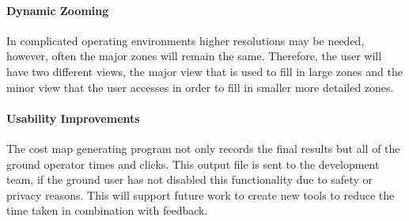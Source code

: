 \paragraph{Dynamic Zooming}
In complicated operating environments higher resolutions may be needed, however, often the major zones will remain the same. Therefore, the user will have two different views, the major view that is used to fill in large zones and the minor view that the user accesses in order to fill in smaller more detailed zones. 
\paragraph{Usability Improvements}
The cost map generating program not only records the final results but all of the ground operator times and clicks. This output file is sent to the development team, if the ground user has not disabled this functionality due to safety or privacy reasons. This will support future work to create new tools to reduce the time taken in combination with feedback.
